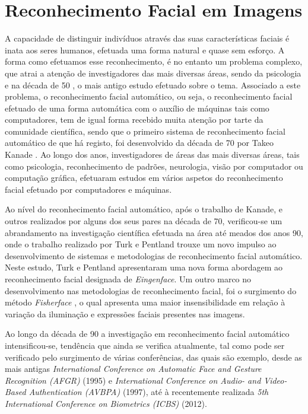 \chapter{Reconhecimento Facial em Imagens} \label{chap:reco}

A capacidade de distinguir indivíduos através das suas características faciais é inata aos seres humanos, efetuada uma forma natural e quase sem esforço. A forma como efetuamos esse reconhecimento, é no entanto um problema complexo, que atrai a atenção de investigadores das mais diversas áreas, sendo da psicologia e na década de 50 \citep{BRUNERJEROMES.TAGIURI1954}, o mais antigo estudo efetuado sobre o tema. Associado a este problema, o reconhecimento facial automático, ou seja, o reconhecimento facial efetuado de uma forma automática com o auxílio de máquinas tais como computadores, tem de igual forma recebido muita atenção por tarte da comunidade científica, sendo que o primeiro sistema de reconhecimento facial automático de que há registo, foi desenvolvido da década de 70 por Takeo Kanade \citep{Kanade1973}. Ao longo dos anos, investigadores de áreas das mais diversas áreas, tais como  psicologia, reconhecimento de padrões, neurologia, visão por computador ou computação gráfica, efetuaram estudos em vários aspetos do reconhecimento facial efetuado por computadores e máquinas.

Ao nível do reconhecimento facial automático, após o trabalho de Kanade, e outros realizados por alguns dos seus pares na década de 70, verificou-se um abrandamento na investigação científica efetuada na área até meados dos anos 90, onde o trabalho realizado por Turk e Pentland \citep{Turk1991} trouxe um novo impulso ao desenvolvimento de sistemas e metodologias de reconhecimento facial automático. Neste estudo, Turk e Pentland apresentaram uma nova forma abordagem ao reconhecimento facial designada de \textit{Eingenface}. Um outro marco no desenvolvimento nas metodologias de reconhecimento facial, foi o surgimento do método \textit{Fisherface} \citep{Belhumeur1997, Zhao1998}, o qual apresenta uma maior insensibilidade em relação à variação da iluminação e expressões faciais presentes nas imagens.

Ao longo da década de 90 a investigação em reconhecimento facial automático intensificou-se, tendência que ainda se verifica atualmente, tal como pode ser verificado pelo surgimento de várias conferências, das quais são exemplo, desde as mais antigas
\textit{International Conference on Automatic Face and Gesture Recognition (AFGR)} (1995) e \textit{International Conference on Audio- and Video-Based Authentication (AVBPA)} (1997), até à recentemente realizada \textit{5th International Conference on Biometrics (ICBS)} (2012).


